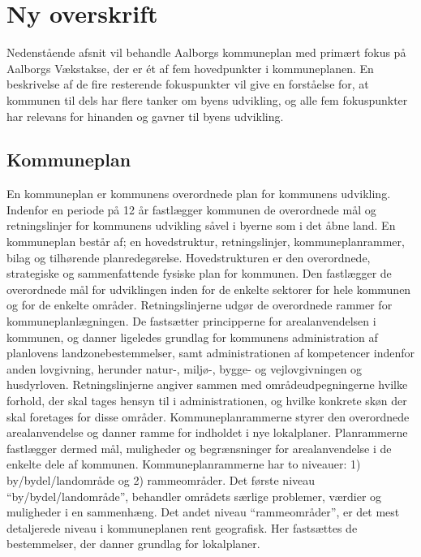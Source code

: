 \chapter{Ny overskrift}
Nedenstående afsnit vil behandle Aalborgs kommuneplan med primært fokus på Aalborgs Vækstakse, der er ét af fem hovedpunkter i kommuneplanen. En beskrivelse af de fire resterende fokuspunkter vil give en forståelse for, at kommunen til dels har flere tanker om byens udvikling, og alle fem fokuspunkter har relevans for hinanden og gavner til byens udvikling.

\section{Kommuneplan}
En kommuneplan er kommunens overordnede plan for kommunens udvikling. Indenfor en periode på 12 år fastlægger kommunen de overordnede mål og retningslinjer for kommunens udvikling såvel i byerne som i det åbne land. 
\newline
\newline
En kommuneplan består af; en hovedstruktur, retningslinjer, kommuneplanrammer, bilag og tilhørende planredegørelse. 
\newline \indent{     }  Hovedstrukturen er den overordnede, strategiske og sammenfattende fysiske plan for kommunen. Den fastlægger de overordnede mål for udviklingen inden for de enkelte sektorer for hele kommunen og for de enkelte områder. 
\newline \indent{     }  Retningslinjerne udgør de overordnede rammer for kommuneplanlægningen. De fastsætter principperne for arealanvendelsen i kommunen, og danner ligeledes grundlag for kommunens administration af planlovens landzonebestemmelser, samt administrationen af kompetencer indenfor anden lovgivning, herunder natur-, miljø-, bygge- og vejlovgivningen og husdyrloven. Retningslinjerne angiver sammen med områdeudpegningerne hvilke forhold, der skal tages hensyn til i administrationen, og hvilke konkrete skøn der skal foretages for disse områder. 
\newline \indent{     }  Kommuneplanrammerne styrer den overordnede arealanvendelse og danner ramme for indholdet i nye lokalplaner. Planrammerne fastlægger dermed mål, muligheder og begrænsninger for arealanvendelse i de enkelte dele af kommunen. Kommuneplanrammerne har to niveauer: 1) by/bydel/landområde og 2) rammeområder. Det første niveau “by/bydel/landområde”, behandler områdets særlige problemer, værdier og muligheder i en sammenhæng. Det andet niveau “rammeområder”, er det mest detaljerede niveau i kommuneplanen rent geografisk. Her fastsættes de bestemmelser, der danner grundlag for lokalplaner.
